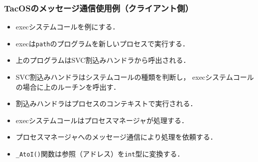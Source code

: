 \documentclass[unicode,handout]{beamer}                   %
\begin{document}
\begin{frame}
  \frametitle{TacOSのメッセージ通信使用例（クライアント側）}
  \begin{itemize}
  \item execシステムコールを例にする．
  \item execは{\tt path}のプログラムを新しいプロセスで実行する．
  \item 上のプログラムはSVC割込みハンドラから呼出される．
  \item SVC割込みハンドラはシステムコールの種類を判断し，
    execシステムコールの場合に上のルーチンを呼出す．
  \item 割込みハンドラはプロセスのコンテキストで実行される．
  \item execシステムコールはプロセスマネージャが処理する．
  \item プロセスマネージャへのメッセージ通信により処理を依頼する．
  \item {\tt \_AtoI()}関数は参照（アドレス）を{\tt int}型に変換する．
  \end{itemize}
\end{frame}
\end{document}
